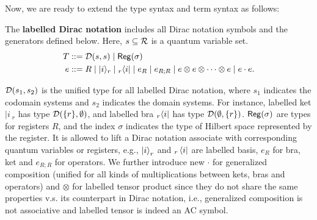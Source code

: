 Now, we are ready to extend the type syntax and term syntax as follows:
\begin{definition}
  The \textbf{labelled Dirac notation} includes all Dirac notation symbols and the generators defined below.
  Here, $s\subseteq \mathcal{R}$ is a quantum variable set.
  \begin{align*}
    T & ::= \mathcal{D}(s,s) \mid \mathsf{Reg}(\sigma) \\
    e & ::= R \mid |i\rangle_r \mid {}_r\langle i| \mid e_R \mid e_{R;R} \mid
    e \otimes e \otimes \cdots \otimes e \mid e \cdot e.
  \end{align*}
\end{definition}
$\mathcal{D}(s_1, s_2)$ is the unified type for all labelled Dirac notation, where $s_1$ indicates the codomain systems and $s_2$ indicates the domain systems. For instance, labelled ket $|i\>_r$ has type $\mathcal{D}(\{r\}, \emptyset)$, and labelled bra ${}_r\langle i|$ has type $\mathcal{D}(\emptyset, \{r\})$.
$\mathsf{Reg}(\sigma)$ are types for registers $R$, and the index $\sigma$ indicates the type of Hilbert space represented by the register.
It is allowed to lift a Dirac notation associate with corresponding quantum variables or registers, e.g., $\ket{i}_r$ and ${}_r\bra{i}$ are labelled basis, 
$e_R$ for bra, ket and $e_{R;R}$ for operators. 
We further introduce new $\cdot$ for generalized composition (unified for all kinds of multiplications between kets, bras and operators) and $\otimes$ for labelled tensor product since they do not share the same properties v.s. its counterpart in Dirac notation, i.e., generalized composition is not associative and labelled tensor is indeed an AC symbol.

